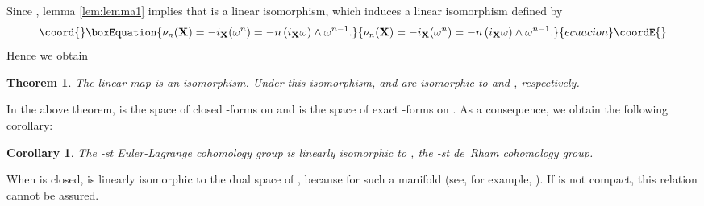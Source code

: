 \documentclass[12pt,a4paper]{article}
\providecommand{\vect}{\mathbf}
\providecommand{\XS}{\mathcal{X}_{\mathrm{S}}}
\providecommand{\XH}{\mathcal{X}_{\mathrm{H}}}
\newtheorem{thm}{Theorem}
\newtheorem{cor}{Corollary}[thm]
\providecommand{\omits}[1]{}
\begin{document}
Since \coordHE{}, lemma
\ref{lem:lemma1} implies that \coordHE{} is a linear isomorphism, which induces a
linear isomorphism
\coordHE{}
defined by
\begin{equation}\coord{}\boxEquation{
  \nu_n(\vect{X}) = - i_{\vect{X}}(\omega^n)
  = -n\,(i_{\vect{X}}\omega)\wedge\omega^{n-1}.
}{
  \nu_n(\vect{X}) = - i_{\vect{X}}(\omega^n)
  = -n\,(i_{\vect{X}}\omega)\wedge\omega^{n-1}.
}{ecuacion}\coordE{}\end{equation}
Hence we obtain
\begin{thm}
The linear map \coordHE{} is an
isomorphism. Under this isomorphism,
\myHighlight{$\XS^{2n-1}(\mathcal{M},\omega)$}\coordHE{} and
\myHighlight{$\XH^{2n-1}(\mathcal{M},\omega)$}\coordHE{} are isomorphic to
\coordHE{} and \coordHE{}, respectively.
\label{thm:thm1}
\end{thm}
In the above theorem, \coordHE{} is the space of closed
\coordHE{}-forms on \coordHE{} and \coordHE{} is the space of
exact \coordHE{}-forms on \coordHE{}. As a consequence, we obtain the
following corollary:
\begin{cor}
  The \coordHE{}-st Euler-Lagrange cohomology group
\coordHE{} is linearly
isomorphic to \coordHE{}, the
\coordHE{}-st de~Rham cohomology group.
\end{cor}

When \coordHE{} is closed\omits{(i.e., compact and without boundary)},
\coordHE{} is linearly
isomorphic to the dual space of
\coordHE{}, because
  \coordHE{}
for such a manifold (see, for example, \cite{Warner}).
If \coordHE{} is not compact, this relation cannot be assured.
\end{document}
